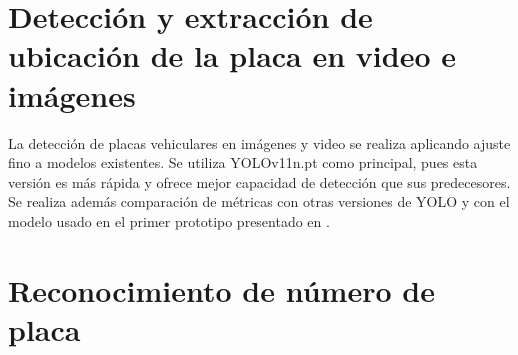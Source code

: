 \section{Detección y extracción de ubicación de la placa en video e imágenes}

La detección de placas vehiculares en imágenes y video se realiza aplicando ajuste fino 
a modelos existentes. Se utiliza YOLOv11n.pt como principal, pues esta versión es 
más rápida y ofrece mejor capacidad de detección que sus predecesores. 
Se realiza además comparación de métricas con otras versiones de YOLO 
y con el modelo usado en el primer prototipo presentado en \cite{proyecto_previo}.

\section{Reconocimiento de número de placa}

